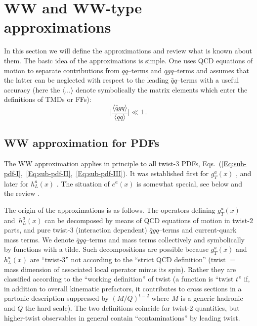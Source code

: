 \documentclass[a4paper,11pt]{article}
\newcommand{\be}{\begin{equation}}
\newcommand{\ee}{\end{equation}}
\newcommand{\la}{\langle}
\newcommand{\ra}{\rangle}
\begin{document}
%
\section{WW and WW-type approximations}
\label{Sec-3:WW}

In this section we will define the approximations and review what is
known about them.
The basic idea of the approximations is simple. One uses QCD
equations of motion to separate contributions from $\bar{q}q$--terms
and $\bar{q}gq$--terms and assumes that the latter can be neglected
with respect to the leading $\bar{q}q$--terms with a useful accuracy
(here the $\la\dots\ra$ denote symbolically the matrix elements
which enter the definitions of TMDs or FFs):
\be\label{Eq:WW-generic}
	\biggl|\frac{\la\bar{q}gq\ra}{\la\bar{q}q\ra}\biggr| \ll 1\,.
\ee

\subsection{WW approximation for PDF\lowercase{s}}
\label{Sec-3.1:WW-classic}

The WW approximation applies in principle to all twist-3 PDFs,
Eqs.~(\ref{Eq:sub-pdf-I},~\ref{Eq:sub-pdf-II},~\ref{Eq:sub-pdf-III}).
It was established first for $g_T^a(x)$ \cite{Wandzura:1977qf}, and
later for $h_L^a(x)$ \cite{Jaffe:1991ra}. The situation of $e^a(x)$
is somewhat special, see below and the review \cite{Efremov:2002qh}.

The origin of the approximations is as follows.
The operators defining $g_T^a(x)$ and~$h_L^a(x)$ can be decomposed by means
of QCD equations of motion in twist-2 parts, and pure twist-3
(interaction dependent) $\bar{q}gq$--terms and current-quark mass
terms. We denote $\bar{q}gq$--terms and mass terms collectively
and symbolically by functions with a tilde.
Such decompositions are possible because $g_T^a(x)$ and $h_L^a(x)$ are
``twist-3'' not according to the ``strict QCD definition''
(twist $=$ mass dimension of associated local operator minus its spin).
Rather they are classified according to the ``working definition''
of twist \cite{Jaffe:1996zw}
(a function is ``twist $t$'' if, in addition to overall kinematic
prefactors, it contributes to cross sections in a partonic
description suppressed by $(M/Q)^{t-2}$ where $M$ is a generic
hadronic and $Q$ the hard scale).
The two definitions coincide for twist-2 quantities, but higher-twist
observables in general contain ``contaminations'' by leading twist.
\end{document}
